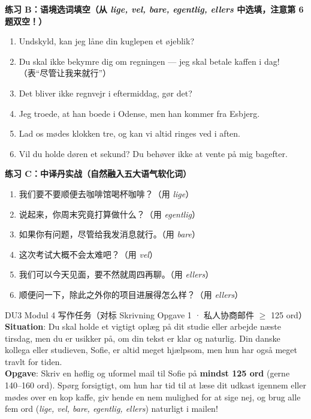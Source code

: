 \textbf{练习 B：语境选词填空（从 \textit{lige, vel, bare, egentlig, ellers} 中选填，注意第 6 题双空！）}
\begin{enumerate}
  \item Undskyld, kan jeg \underline{\hspace{2.2cm}} låne din kuglepen et øjeblik?
  \item Du skal ikke bekymre dig om regningen --- jeg skal \underline{\hspace{2.2cm}} betale kaffen i dag!（表“尽管让我来就行”）
  \item Det bliver \underline{\hspace{2.2cm}} ikke regnvejr i eftermiddag, gør det?
  \item Jeg troede, at han boede i Odense, men han kommer \underline{\hspace{2.2cm}} fra Esbjerg.
  \item Lad os mødes klokken tre, og \underline{\hspace{2.2cm}} kan vi altid ringes ved i aften.
  \item Vil du \underline{\hspace{2.2cm}} holde døren et sekund? Du behøver \underline{\hspace{2.2cm}} ikke at vente på mig bagefter.
\end{enumerate}

\textbf{练习 C：中译丹实战（自然融入五大语气软化词）}
\begin{enumerate}
  \item 我们要不要顺便去咖啡馆喝杯咖啡？（用 \textit{lige}）
  \item 说起来，你周末究竟打算做什么？（用 \textit{egentlig}）
  \item 如果你有问题，尽管给我发消息就行。（用 \textit{bare}）
  \item 这次考试大概不会太难吧？（用 \textit{vel}）
  \item 我们可以今天见面，要不然就周四再聊。（用 \textit{ellers}）
  \item 顺便问一下，除此之外你的项目进展得怎么样？（用 \textit{ellers}）
\end{enumerate}


\begin{emailbox}{DU3 Modul 4 写作任务（对标 Skrivning Opgave 1 · 私人协商邮件 $\ge$ 125 ord）}
\textbf{Situation}: Du skal holde et vigtigt oplæg på dit studie eller arbejde næste tirsdag, men du er usikker på, om din tekst er klar og naturlig. Din danske kollega eller studieven, Sofie, er altid meget hjælpsom, men hun har også meget travlt for tiden.\\
\textbf{Opgave}: Skriv en høflig og uformel mail til Sofie på \textbf{mindst 125 ord} (gerne 140--160 ord). Spørg forsigtigt, om hun har tid til at læse dit udkast igennem eller mødes over en kop kaffe, giv hende en nem mulighed for at sige nej, og brug alle fem ord (\textit{lige, vel, bare, egentlig, ellers}) naturligt i mailen!
\end{emailbox}

